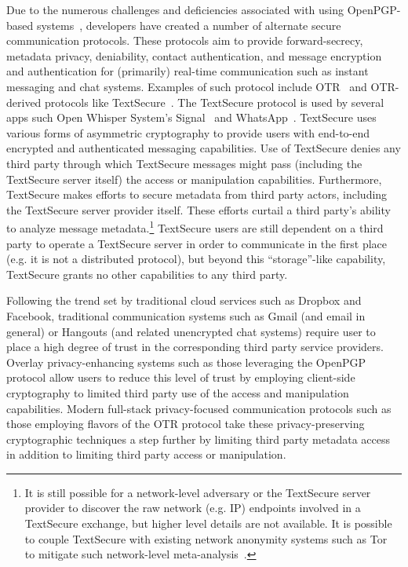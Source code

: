 Due to the numerous challenges and deficiencies associated with using
OpenPGP-based systems~\cite{borisov2004, green-pgp, whitten1999},
developers have created a number of alternate secure communication
protocols. These protocols aim to provide forward-secrecy, metadata
privacy, deniability, contact authentication, and message encryption
and authentication for (primarily) real-time communication such as
instant messaging and chat systems. Examples of such protocol include
OTR~\cite{otr-v3} and OTR-derived protocols like
TextSecure~\cite{otr-advanced-ratchet}. The TextSecure protocol is
used by several apps such Open Whisper System's
Signal~\cite{openwhisper} and WhatsApp~\cite{whatsapp}. TextSecure
uses various forms of asymmetric cryptography to provide users with
end-to-end encrypted and authenticated messaging capabilities. Use of
TextSecure denies any third party through which TextSecure messages
might pass (including the TextSecure server itself) the access or
manipulation capabilities. Furthermore, TextSecure makes efforts to
secure metadata from third party actors, including the TextSecure
server provider itself. These efforts curtail a third party's ability
to analyze message metadata.\footnote{It is still possible for a
  network-level adversary or the TextSecure server provider to
  discover the raw network (e.g. IP) endpoints involved in a
  TextSecure exchange, but higher level details are not available. It
  is possible to couple TextSecure with existing network anonymity
  systems such as Tor~\cite{dingledine2004} to mitigate such
  network-level meta-analysis~\cite{intercept-chatting}.} TextSecure
users are still dependent on a third party to operate a TextSecure
server in order to communicate in the first place (e.g. it is not a
distributed protocol), but beyond this ``storage''-like capability,
TextSecure grants no other capabilities to any third party.

Following the trend set by traditional cloud services such as Dropbox
and Facebook, traditional communication systems such as Gmail (and
email in general) or Hangouts (and related unencrypted chat systems)
require user to place a high degree of trust in the corresponding
third party service providers. Overlay privacy-enhancing systems such
as those leveraging the OpenPGP protocol allow users to reduce this
level of trust by employing client-side cryptography to limited third
party use of the access and manipulation capabilities. Modern
full-stack privacy-focused communication protocols such as those
employing flavors of the OTR protocol take these privacy-preserving
cryptographic techniques a step further by limiting third party
metadata access in addition to limiting third party access or
manipulation.

